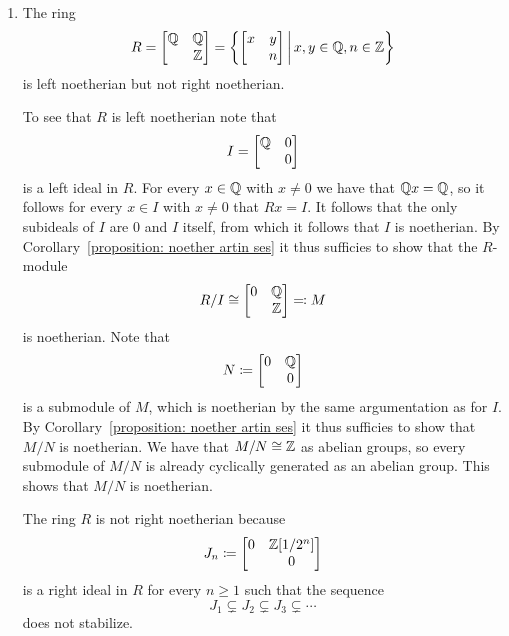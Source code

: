 \begin{example}
\begin{enumerate}
    \item
      \label{enumerate: left noetherian but not right noetherian}
      The ring
      \[
          R
        = \begin{bmatrix}
            \Rational & \Rational \\
                      & \Integer
          \end{bmatrix}
        = \left\{
            \begin{bmatrix}
              x & y \\
                & n 
            \end{bmatrix}
          \suchthat*
            x, y \in \Rational,
            n \in \Integer
          \right\}
      \]
      is left noetherian but not right noetherian.
      
      To see that $R$ is left noetherian note that
      \[
          I
        = \begin{bmatrix}
            \mathbb{Q} & 0 \\
                      & 0
          \end{bmatrix}
      \]
      is a left ideal in $R$.
      For every $x \in \mathbb{Q}$ with $x \neq 0$ we have that $\mathbb{Q} x = \mathbb{Q}$, so it follows for every $x \in I$ with $x \neq 0$ that $Rx = I$.
      It follows that the only subideals of $I$ are $0$ and $I$ itself, from which it follows that $I$ is noetherian.
      By Corollary~\ref{proposition: noether artin ses} it thus sufficies to show that the $R$-module
      \[
                R/I
        \cong   \begin{bmatrix}
                  0 & \mathbb{Q} \\
                    & \mathbb{Z}
                \end{bmatrix}
        \eqqcolon M
      \]
      is noetherian.
      Note that
      \[
                  N
        \coloneqq  \begin{bmatrix}
                    0 & \mathbb{Q} \\
                      & 0
                  \end{bmatrix}
      \]
      is a submodule of $M$, which is noetherian by the same argumentation as for $I$.
      By Corollary~\ref{proposition: noether artin ses} it thus sufficies to show that $M/N$ is noetherian.
      We have that $M/N \cong \mathbb{Z}$ as abelian groups, so every submodule of $M/N$ is already cyclically generated as an abelian group.
      This shows that $M/N$ is noetherian.
      
      The ring $R$ is not right noetherian because
      \[
                  J_n
        \coloneqq  \begin{bmatrix}
                    0 & \mathbb{Z}[1/2^n] \\
                      & 0
                  \end{bmatrix}
      \]
      is a right ideal in $R$ for every $n \geq 1$ such that the sequence
      \[
                    J_1
        \subsetneq  J_2
        \subsetneq  J_3
        \subsetneq  \dotsb
      \]
      does not stabilize.
  \end{enumerate}
\end{example}



